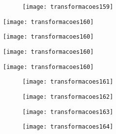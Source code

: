 \begin{figure}[H]
\centering

\texttt{[image: transformacoes159]}
\end{figure}

\begin{multicols}{2}


\texttt{[image: transformacoes160]}

\texttt{[image: transformacoes160]}

\texttt{[image: transformacoes160]}

\texttt{[image: transformacoes160]}

\end{multicols}


\begin{figure}[H]
\centering

\texttt{[image: transformacoes161]}
\end{figure}


\begin{figure}[H]
\centering

\texttt{[image: transformacoes162]}
\end{figure}

\begin{figure}[H]
\centering

\texttt{[image: transformacoes163]}
\end{figure}

\begin{figure}[H]
\centering

\texttt{[image: transformacoes164]}
\end{figure}








\nocite{*}